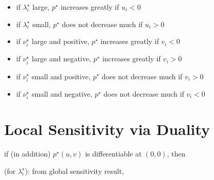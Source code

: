\documentclass[11pt]{extarticle}
\theoremstyle{definition}
\begin{document}
\begin{itemize}\setlength\itemsep{0em}
  \item if $\lambda_i^\star$ large, $p^\star$ increases greatly if $u_i < 0$
  \item if $\lambda_i^\star$ small, $p^\star$ does not decrease much if $u_i > 0$
  \item if $\nu_i^\star$ large and positive, $p^\star$ increases greatly if $v_i < 0$
  \item if $\nu_i^\star$ large and negative, $p^\star$ increases greatly if $v_i > 0$
  \item if $\nu_i^\star$ small and positive, $p^\star$ does not decrease much if $v_i > 0$
  \item if $\nu_i^\star$ small and negative, $p^\star$ does not decrease much if $v_i < 0$
\end{itemize}

\newpage

\section*{Local Sensitivity via Duality}

if (in addition) $p^\star(u, v)$ is differentiable at $(0, 0)$, then  \\

 (for $\lambda_i^\star$): from global sensitivity result, \\
\end{document}
